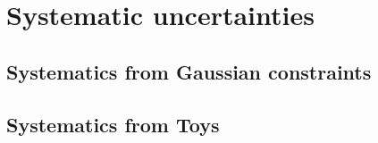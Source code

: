 \chapter{Systematic uncertainties}

\blindtext

\section{Systematics from Gaussian constraints}

\Blindtext

\section{Systematics from Toys}

\Blindtext
